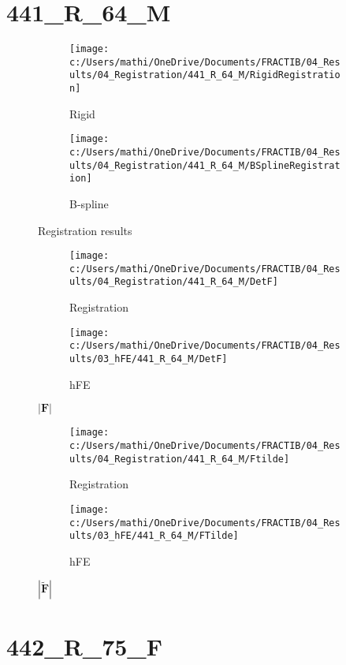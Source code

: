 \documentclass{article}%
\begin{document}
\section*{441\_R\_64\_M}%
\label{sec:441R64M}%


\begin{figure}[h!]%
\begin{subfigure}[b]{0.5\linewidth}%
\texttt{[image: c:/Users/mathi/OneDrive/Documents/FRACTIB/04\_Results/04\_Registration/441\_R\_64\_M/RigidRegistration]}%
\caption{Rigid}%
\end{subfigure}%
\begin{subfigure}[b]{0.5\linewidth}%
\texttt{[image: c:/Users/mathi/OneDrive/Documents/FRACTIB/04\_Results/04\_Registration/441\_R\_64\_M/BSplineRegistration]}%
\caption{B{-}spline}%
\end{subfigure}%
\caption{Registration results}%
\end{figure}

%


\begin{figure}[h!]%
\begin{subfigure}[b]{0.5\linewidth}%
\texttt{[image: c:/Users/mathi/OneDrive/Documents/FRACTIB/04\_Results/04\_Registration/441\_R\_64\_M/DetF]}%
\caption{Registration}%
\end{subfigure}%
\begin{subfigure}[b]{0.5\linewidth}%
\texttt{[image: c:/Users/mathi/OneDrive/Documents/FRACTIB/04\_Results/03\_hFE/441\_R\_64\_M/DetF]}%
\caption{hFE}%
\end{subfigure}%
\caption{$|\mathbf{F}|$}%
\end{figure}

%


\begin{figure}[h!]%
\begin{subfigure}[b]{0.5\linewidth}%
\texttt{[image: c:/Users/mathi/OneDrive/Documents/FRACTIB/04\_Results/04\_Registration/441\_R\_64\_M/Ftilde]}%
\caption{Registration}%
\end{subfigure}%
\begin{subfigure}[b]{0.5\linewidth}%
\texttt{[image: c:/Users/mathi/OneDrive/Documents/FRACTIB/04\_Results/03\_hFE/441\_R\_64\_M/FTilde]}%
\caption{hFE}%
\end{subfigure}%
\caption{$|\widetilde{\mathbf{F}}|$}%
\end{figure}

%
\newpage%
\section*{442\_R\_75\_F}%
\label{sec:442R75F}%
\end{document}
